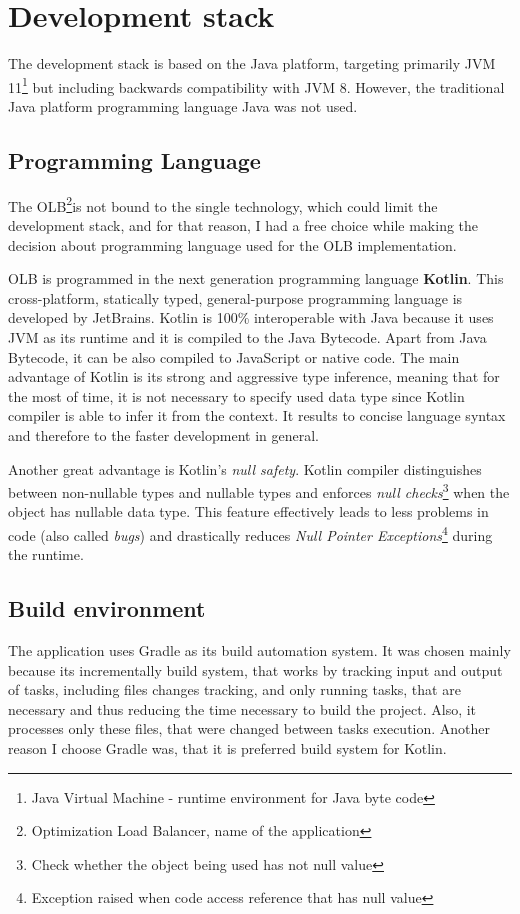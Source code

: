 \section{Development stack}\label{sec:development-stack}
The development stack is based on the Java platform, 
targeting primarily JVM 11\footnote{Java Virtual Machine - runtime environment for Java byte code}
but including backwards compatibility with JVM 8.
However, 
the traditional Java platform programming language Java was not used.

\subsection{Programming Language}\label{subsec:programming-language}
The OLB\footnote{Optimization Load Balancer, name of the application}is not bound to the single technology, 
which could limit the development stack, and for that reason,
I had a free choice while making the decision about programming language used for the OLB implementation.

OLB is programmed in the next generation programming language \textbf{Kotlin}.
This cross-platform, statically typed, general-purpose programming language is developed by JetBrains\cite{kotlinReference}.
Kotlin is 100\% interoperable with Java because it uses JVM as its runtime and it is compiled to the Java Bytecode.
Apart from Java Bytecode, it can be also compiled to JavaScript or native code.\cite{kotlinReference}
The main advantage of Kotlin is its strong and aggressive type inference,
meaning that for the most of time,
it is not necessary to specify used data type since Kotlin compiler is able to infer it from the context.\cite{kotlinReference}
It results to concise language syntax and therefore to the faster development in general.

Another great advantage is Kotlin's \textit{null safety}. 
Kotlin compiler distinguishes between non-nullable types and nullable types 
and enforces \textit{null checks}\footnote{Check whether the object being used has not null value} when the object has nullable data type.
This feature effectively leads to less problems in code (also called \textit{bugs})
and drastically reduces \textit{Null Pointer Exceptions}\footnote{Exception raised when code access reference that has null value}
during the runtime.

\subsection{Build environment}
The application uses Gradle as its build automation system.
It was chosen mainly because its incrementally build system,
that works by tracking input and output of tasks, 
including files changes tracking, and only running tasks, that are necessary
and thus reducing the time necessary to build the project. 
Also, it processes only these files, that were changed between tasks execution. 
Another reason I choose Gradle was, that it is preferred build system for Kotlin.

